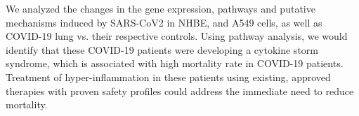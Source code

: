 We analyzed  the changes in the gene expression, pathways and putative mechanisms induced by SARS-CoV2 in  NHBE, and A549 cells, as well as COVID-19 lung vs. their respective controls.  Using pathway analysis, we would identify that these COVID-19 patients were developing a cytokine storm syndrome, which is associated with high mortality rate in COVID-19 patients. Treatment of hyper-inflammation in these patients using existing, approved therapies with proven safety profiles could address the immediate need to reduce mortality. 








